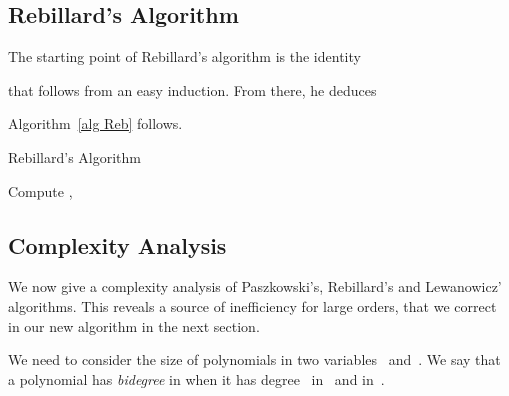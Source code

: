 \documentclass{amsart}
\theoremstyle{definition}
\begin{document}
\subsection{Rebillard's Algorithm}                        
The starting point of Rebillard's algorithm is the identity

that follows from an easy induction.
From there, he deduces

Algorithm~\ref{alg Reb} follows.
\begin{algorithm}
  \caption{Rebillard's Algorithm}
  \label{alg Reb}
  \begin{algorithmic}
    \REQUIRE 
    \ENSURE 
	\STATE Compute , 
	\STATE 
    	\STATE 
	\ENDFOR
	\RETURN 
  \end{algorithmic}
\end{algorithm}

\subsection{Complexity Analysis}
We now give a complexity analysis of Paszkowski's, Rebillard's and Lewanowicz' algorithms. This reveals a source of inefficiency for large orders, that we correct in our new algorithm in the next section.

We need to consider the size of  polynomials in two variables~ and~. We say that a polynomial has \emph{bidegree}  in  when it has degree~ in~ and  in~.
\end{document}
